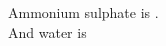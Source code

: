 \documentclass[12pt]{article}
\begin{document}
	
	\noindent
	\Huge
	Ammonium sulphate is .\\
	And water is 
	
\end{document}
